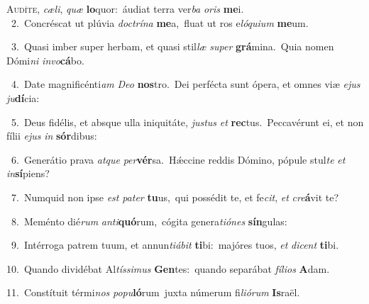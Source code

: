 \lettrine{\initial\textcolor{\initialcolor}{A}}{udíte,} \textit{cæ}\-\textit{li}, \textit{quæ} \textbf{lo}\-quor:~\star áudiat terra ver\textit{ba} \textit{o}\-\textit{ris} \textbf{me}\-i.\\
{\numbfont\textcolor{\numbcolor}{~2.}}~Concréscat ut plúvia \textit{doc}\-\textit{trí}\textit{na} \textbf{me}\-a,~\star fluat ut ros e\-\textit{ló}\-\textit{qui}\textit{um} \textbf{me}\-um.\par
{\numbfont\textcolor{\numbcolor}{~3.}}~Quasi imber super herbam, et quasi stil\textit{læ} \textit{su}\-\textit{per} \textbf{grá}\-mina.~\star Quia nomen Dómi\textit{ni} \textit{in}\-\textit{vo}\textbf{cá}bo.\par
{\numbfont\textcolor{\numbcolor}{~4.}}~Date magnificénti\textit{am} \textit{De}\-\textit{o} \textbf{nos}\-tro.~\star Dei perfécta sunt ópera, et omnes viæ \textit{e}\-\textit{jus} \textit{ju}\-\textbf{dí}cia:\par
{\numbfont\textcolor{\numbcolor}{~5.}}~Deus fidélis, et absque ulla iniquitáte, \textit{jus}\-\textit{tus} \textit{et} \textbf{rec}\-tus.~\star Peccavérunt ei, et non fílii \textit{e}\-\textit{jus} \textit{in} \textbf{sór}\-dibus:\par
{\numbfont\textcolor{\numbcolor}{~6.}}~Generátio prava \textit{at}\-\textit{que} \textit{per}\-\textbf{vér}sa.~\star Hǽccine reddis Dómino, pópule stul\textit{te} \textit{et} \textit{in}\-\textbf{sí}piens?\par
{\numbfont\textcolor{\numbcolor}{~7.}}~Numquid non ipse \textit{est} \textit{pa}\-\textit{ter} \textbf{tu}\-us,~\star qui possédit te, et fe\-\textit{cit}\-, \textit{et} \textit{cre}\-\textbf{á}vit te?\par
{\numbfont\textcolor{\numbcolor}{~8.}}~Meménto dié\textit{rum} \textit{an}\-\textit{ti}\textbf{quó}rum,~\star cógita genera\-\textit{ti}\-\textit{ó}\textit{nes} \textbf{sín}\-gulas:\par
{\numbfont\textcolor{\numbcolor}{~9.}}~Intérroga patrem tuum, et annun\-\textit{ti}\-\textit{á}\textit{bit} \textbf{ti}\-bi:~\star majóres tuos, \textit{et} \textit{di}\-\textit{cent} \textbf{ti}\-bi.\par
{\numbfont\textcolor{\numbcolor}{10.}}~Quando dividébat Al\-\textit{tís}\-\textit{si}\textit{mus} \textbf{Gen}\-tes:~\star quando separábat \textit{fí}\-\textit{li}\textit{os} \textbf{A}\-dam.\par
{\numbfont\textcolor{\numbcolor}{11.}}~Constítuit térmi\textit{nos} \textit{po}\-\textit{pu}\textbf{ló}rum~\star juxta númerum fi\-\textit{li}\-\textit{ó}\textit{rum} \textbf{Is}\-raël.\par
